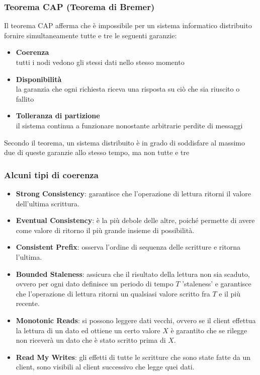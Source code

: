 \begin{frame}
\frametitle{Teorema CAP (Teorema di Bremer)}
	\begin{definizione}
	 Il \alert{teorema CAP} afferma che è impossibile per un sistema informatico distribuito fornire simultaneamente tutte e tre le seguenti garanzie:
	\begin{itemize}
		\item \textbf{Coerenza}\\
		tutti i nodi vedono gli stessi dati nello stesso momento
		\item \textbf{Disponibilità}\\
	    la garanzia che ogni richiesta riceva una risposta su ciò che sia riuscito o fallito
		\item \textbf{Tolleranza di partizione}\\
		il sistema continua a funzionare nonostante arbitrarie perdite di messaggi
	\end{itemize}
	Secondo il teorema, un sistema distribuito è in grado di soddisfare al massimo due di queste garanzie allo stesso tempo, ma non tutte e tre
	\end{definizione}
\end{frame}

\begin{frame}
\frametitle{Alcuni tipi di coerenza}
\begin{itemize}
  \item \textbf{Strong Consistency}: garantisce che l'operazione di lettura ritorni il valore dell'ultima scrittura.
  \item \textbf{Eventual Consistency}: è la più debole delle altre, poiché permette di avere come valore di ritorno il più grande insieme di possibilità.
  \item \textbf{Consistent Prefix}: osserva l'ordine di sequenza delle scritture e ritorna l'ultima.
  \item \textbf{Bounded Staleness}: assicura che il risultato della lettura non sia scaduto, ovvero per ogni dato definisce un periodo di tempo $T$ 'staleness' e garantisce che l'operazione di lettura ritorni un qualsiasi valore scritto fra $T$ e il più recente.
  \item \textbf{Monotonic Reads}: si possono leggere dati vecchi, ovvero se il client effettua la lettura di un dato ed ottiene un certo valore $X$ è garantito che se rilegge non riceverà un dato che è stato scritto prima di $X$. 
  \item \textbf{Read My Writes}: gli effetti di tutte le scritture che sono state fatte da un client, sono visibili al client successivo che legge quei dati.
\end{itemize}
\end{frame}

